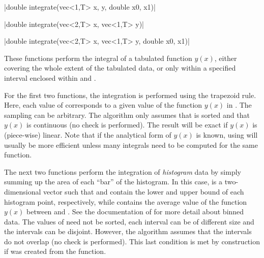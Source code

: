 \cppinline|double integrate(vec<1,T> x, y, double x0, x1)|

\cppinline|double integrate(vec<2,T> x, vec<1,T> y)|

\cppinline|double integrate(vec<2,T> x, vec<1,T> y, double x0, x1)|

These functions perform the integral of a tabulated function $y(x)$, either covering the whole extent of the tabulated data, or only within a specified interval enclosed within  and .

For the first two functions, the integration is performed using the trapezoid rule. Here, each value of  corresponds to a given value of the function $y(x)$ in . The sampling can be arbitrary. The algorithm only assumes that  is sorted and that $y(x)$ is continuous (no check is performed). The result will be exact if $y(x)$ is (piece-wise) linear. Note that if the analytical form of $y(x)$ is known, using  will usually be more efficient unless many integrals need to be computed for the same function.

The next two functions perform the integration of \emph{histogram} data by simply summing up the area of each ``bar'' of the histogram. In this case,  is a two-dimensional vector such that  and  contain the lower and upper bound of each histogram point, respectively, while  contains the average value of the function $y(x)$ between  and . See the documentation of  for more detail about binned data. The values of  need not be sorted, each interval can be of different size and the intervals can be disjoint. However, the algorithm assumes that the intervals do not overlap (no check is performed). This last condition is met by construction if  was created from the  function.

